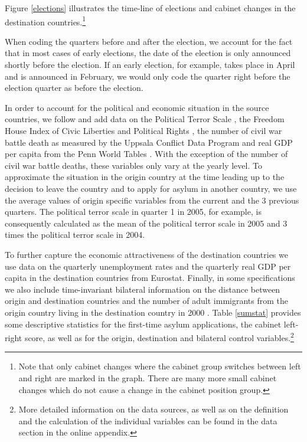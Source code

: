 \documentclass[a4paper,12pt]{article}
\begin{document}
Figure \ref{elections} illustrates the time-line of elections and cabinet changes in the destination countries.\footnote{Note that only cabinet changes where the cabinet group switches between left and right are marked in the graph. There are many more small cabinet changes which do not cause a change in the cabinet position group.}

 

When coding the quarters before and after the election, we account for the fact that in most cases of early elections, the date of the election is only announced shortly before the election. If an early election, for example, takes place in April and is announced in February, we would only code the quarter right before the election quarter as before the election. 

In order to account for the political and economic situation in the source countries, we follow \cite{hatton2016} and add data on the Political Terror Scale \citep{PTS2016}, the Freedom House Index of Civic Liberties and Political Rights \citep{FHI2017}, the number of civil war battle death as measured by the Uppsala Conflict Data Program \citep{Uppsala2017} and real GDP per capita from the Penn World Tables \citep{PWT2015}.  With the exception of the number of civil war battle deaths, these variables only vary at the yearly level. To approximate the situation in the origin country at the time leading up to the decision to leave the country and to apply for asylum in another country, we use the average values of origin specific variables from the current and the 3 previous quarters. The political terror scale in quarter 1 in 2005, for example, is consequently calculated as the mean of the political terror scale in 2005 and 3 times the political terror scale in 2004. 

To further capture the economic attractiveness of the destination countries we use data on the quarterly unemployment rates and the quarterly real GDP per capita in the destination countries from Eurostat. Finally, in some specifications we also include time-invariant bilateral information on the distance between origin and destination countries \citep{distance2017} and the number of adult immigrants from the origin country living in the destination country in 2000 \citep{Artucc2015}. Table \ref{sumstat} provides some descriptive statistics for the first-time asylum applications, the cabinet left-right score, as well as for the origin, destination and bilateral control variables.\footnote{More detailed information on the data sources, as well as on the definition and the calculation of the individual variables can be found in the data section in the online appendix.}
\end{document}
